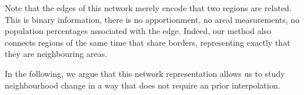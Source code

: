 Note that the edges of this network merely encode that two regions are related.
This is binary information, there is no apportionment, no areal measurements,
no population percentages associated with the edge. Indeed, our method also
connects regions of the same time that share borders, representing exactly that
they are neighbouring areas.

In the following, we argue that this network representation allows us to study
neighbourhood change in a way that does not require an prior interpolation. 
